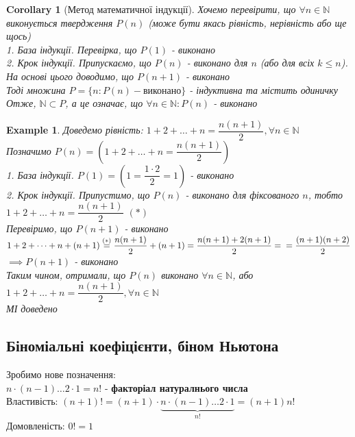 \documentclass[a4paper, 14pt]{extarticle}
\theoremstyle{theoremdd}
\theoremstyle{theoremdd}
\theoremstyle{theoremdd}
\theoremstyle{theoremdd}
\newtheorem{example}[theorem]{Example}
\theoremstyle{theoremdd}
\theoremstyle{theoremdd}
\theoremstyle{theoremdd}
\theoremstyle{theoremdd}
\newtheorem{corollary}[theorem]{Corollary}
\begin{document}
	\begin{corollary}[Метод математичної індукції]
	Хочемо перевірити, що $\forall n \in \mathbb{N}$ виконується твердження $P(n)$ (може бути якась рівність, нерівність або ще щось)\\
	1. База індукції. Перевірка, що $P(1)$ - виконано\\
	2. Крок індукції. Припускаємо, що $P(n)$ - виконано для $n$ (або для всіх $k \leq n$). На основі цього доводимо, що $P(n+1)$ - виконано\\
	Тоді множина $P = \{n: P(n) - \textrm{виконано}\}$ - індуктивна та містить одиничку\\
	Отже, $\mathbb{N} \subset P$, а це означає, що $\forall n \in \mathbb{N}: P(n)$ - виконано
	\end{corollary}
	
	\begin{example}
	Доведемо рівність: $1 + 2 + \dots + n = \dfrac{n(n+1)}{2}, \forall n \in \mathbb{N}$\\
	Позначимо $P(n) = \left(1 + 2 + \dots + n = \dfrac{n(n+1)}{2} \right)$\\
	1. База індукції. $P(1) = \left(1 = \dfrac{1\cdot 2}{2} = 1 \right)$ - виконано\\
	2. Крок індукції. Припустимо, що $P(n)$ - виконано для фіксованого $n$, тобто\\
	$1 + 2 + \dots + n = \dfrac{n(n+1)}{2}$ $(*)$\\
	Перевіримо, що $P(n+1)$ - виконано\\
	$1 + 2 + \dots + n + (n+1) \overset{(*)}{=} \dfrac{n(n+1)}{2} + (n+1) = \dfrac{n(n+1)+2(n+1)}{2} = \\ = \dfrac{(n+1)(n+2)}{2}$\\
	$\implies P(n+1)$ - виконано\\
	Таким чином, отримали, що $P(n)$ виконано $\forall n \in \mathbb{N}$, або\\
	$1 + 2 + \dots + n = \dfrac{n(n+1)}{2}, \forall n \in \mathbb{N}$\\
	МІ доведено
	\end{example}
	
	\subsection{Біноміальні коефіцієнти, біном Ньютона}
	Зробимо нове позначення: \\ $n\cdot (n-1) \dots 2 \cdot 1 = n!$ - \textbf{факторіал натуралнього числа}\\
	Властивість: $(n+1)! = (n+1) \cdot \underbrace{n \cdot (n-1) \dots 2 \cdot 1}_{n!} = (n+1)n!$\\
	Домовленість: $0! = 1$
	
\end{document}
